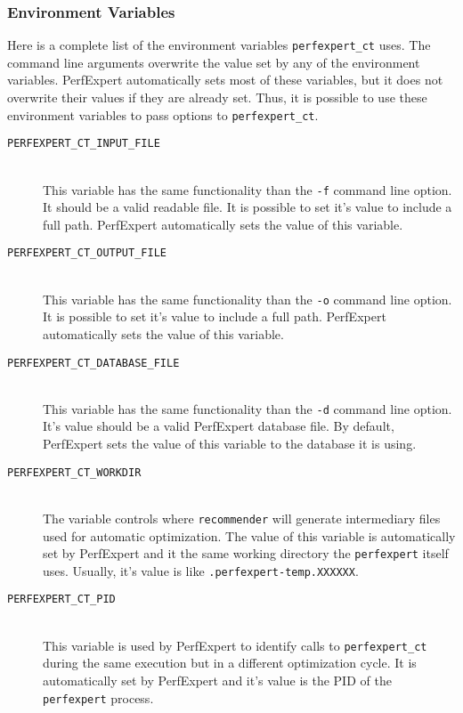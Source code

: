\subsubsection{Environment Variables}

Here is a complete list of the environment variables \texttt{perfexpert\_ct} uses. The command line arguments overwrite the value set by any of the environment variables. PerfExpert automatically sets most of these variables, but it does not overwrite their values if they are already set. Thus, it is possible to use these environment variables to pass options to \texttt{perfexpert\_ct}.

\begin{description}
	\item[\texttt{PERFEXPERT\_CT\_INPUT\_FILE}]\hfill \\
	This variable has the same functionality than the \texttt{-f} command line option. It should be a valid readable file. It is possible to set it's value to include a full path. PerfExpert automatically sets the value of this variable.

	\item[\texttt{PERFEXPERT\_CT\_OUTPUT\_FILE}]\hfill \\
	This variable has the same functionality than the \texttt{-o} command line option.  It is possible to set it's value to include a full path. PerfExpert automatically sets the value of this variable.

	\item[\texttt{PERFEXPERT\_CT\_DATABASE\_FILE}]\hfill \\
	This variable has the same functionality than the \texttt{-d} command line option. It's value should be a valid PerfExpert database file. By default, PerfExpert sets the value of this variable to the database it is using.

	\item[\texttt{PERFEXPERT\_CT\_WORKDIR}]\hfill \\
	The variable controls where \texttt{recommender} will generate intermediary files used for automatic optimization. The value of this variable is automatically set by PerfExpert and it the same working directory the \texttt{perfexpert} itself uses. Usually, it's value is like \texttt{.perfexpert-temp.XXXXXX}.

	\item[\texttt{PERFEXPERT\_CT\_PID}]\hfill \\
	This variable is used by PerfExpert to identify calls to \texttt{perfexpert\_ct} during the same execution but in a different optimization cycle. It is automatically set by PerfExpert and it's value is the PID of the \texttt{perfexpert} process.


\end{description}
